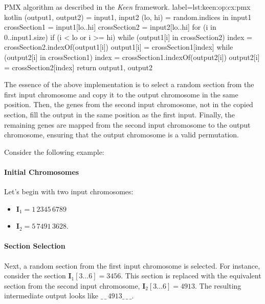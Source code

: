   \begin{code}{
      PMX algorithm as described in the \textit{Keen} framework.
  }{
      label={lst:keen:op:cx:pmx}
  }{kotlin}
    (output1, output2) = input1, input2
    (lo, hi) = random.indices in input1
    crossSection1 = input1[lo..hi]
    crossSection2 = input2[lo..hi]
    for (i in 0..input1.size) {
        if (i < lo or i >= hi) {
            while (output1[i] in crossSection2) {
                index = crossSection2.indexOf(output1[i])
                output1[i] = crossSection1[index]
            }
            while (output2[i] in crossSection1) {
                index = crossSection1.indexOf(output2[i])
                output2[i] = crossSection2[index]
            }
        }
    }
    return output1, output2
  \end{code}

  The essence of the above implementation is to select a random section from the
  first input chromosome and copy it to the output chromosome in the same
  position. Then, the genes from the second input chromosome, not in the copied
  section, fill the output in the same position as the first input. Finally,
  the remaining genes are mapped from the second input chromosome to the
  output chromosome, ensuring that the output chromosome is a valid
  permutation. 
  
  Consider the following example:
  \paragraph{Initial Chromosomes}

    Let's begin with two input chromosomes:

    \begin{itemize}
      \item \(\mathbf{I}_1 = 1\,2345\,6789\)
      \item \(\mathbf{I}_2 = 5\,7491\,3628\).
    \end{itemize}

  \paragraph{Section Selection}

    Next, a random section from the first input chromosome is selected. For 
    instance, consider the section \(\textbf{I}_1[3\dots6] = 3456\). This 
    section is replaced with the equivalent section from the second input 
    chromosome, \(\textbf{I}_2[3\dots6] = 4913\). The resulting intermediate 
    output looks like \(\_\,\_\,4913\_\,\_\,\_\).

